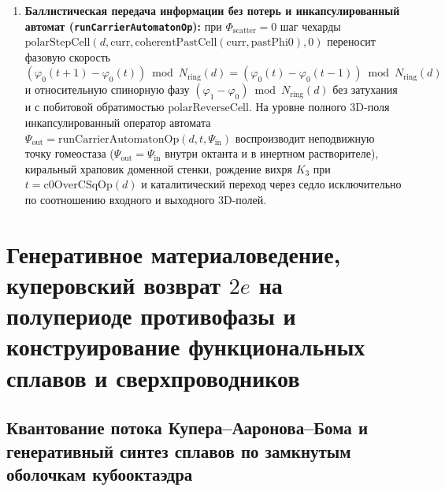 \begin{theorem}
\begin{enumerate}[label=\textbf{(\roman*)},leftmargin=*]
  \[
    \mathrm{waveguideNoiseScatterGateOp}\bigl(d,d\cdot\varepsilon(d)\bigr) \;=\; 0,
    \qquad
    \mathrm{energyQuantumOperator}\bigl(d,\mathrm{waveguideNoiseScatterGateOp}(d,d\cdot\varepsilon(d))\bigr) \;=\; 0,
  \]
  тогда как продольный ток переноса энергии на седле $\Delta\varphi_{\mathrm{sig}} = Q_\square(d)$ достигает полного потолка $\mathrm{reactionCurrentOp}(d,\mu_{\mathrm{vac}}(d),K_P(d),K_P(d),Q_\square(d)) = K_P(d)^2\cdot Q_\square(d)$.
\item \textbf{Баллистическая передача информации без потерь и инкапсулированный автомат (\texttt{runCarrierAutomatonOp}):}
  при $\Phi_{\mathrm{scatter}}=0$ шаг чехарды $\mathrm{polarStepCell}(d,\mathrm{curr},\mathrm{coherentPastCell}(\mathrm{curr},\mathrm{pastPhi0}),0)$ переносит фазовую скорость $(\varphi_0(t+1)-\varphi_0(t))\bmod N_{\mathrm{ring}}(d) = (\varphi_0(t)-\varphi_0(t-1))\bmod N_{\mathrm{ring}}(d)$ и относительную спинорную фазу $(\varphi_1-\varphi_0)\bmod N_{\mathrm{ring}}(d)$ без затухания и с побитовой обратимостью $\mathrm{polarReverseCell}$. На уровне полного 3D-поля инкапсулированный оператор автомата $\Psi_{\mathrm{out}} = \mathrm{runCarrierAutomatonOp}(d,t,\Psi_{\mathrm{in}})$ воспроизводит неподвижную точку гомеостаза ($\Psi_{\mathrm{out}}=\Psi_{\mathrm{in}}$ внутри октанта и в инертном растворителе), киральный храповик доменной стенки, рождение вихря $K_3$ при $t=\mathrm{c0OverCSqOp}(d)$ и каталитический переход через седло исключительно по соотношению входного и выходного 3D-полей.
\end{enumerate}
\end{theorem}

\chapter{Генеративное материаловедение, куперовский возврат \texorpdfstring{$2e$}{2e} на полупериоде противофазы и конструирование функциональных сплавов и сверхпроводников}
\label{ch:applied-materials-cad-superconductivity}

\section{Квантование потока Купера--Ааронова--Бома и генеративный синтез сплавов по замкнутым оболочкам кубооктаэдра}
\label{sec:applied-cooper-and-alloys}

